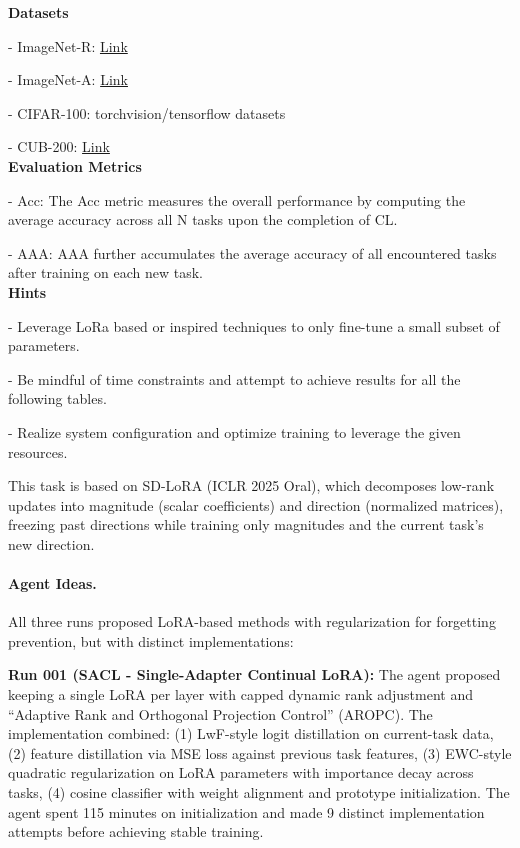\documentclass[11pt]{article}
\theoremstyle{plain}
\theoremstyle{definition}
\theoremstyle{remark}
\begin{document}
\begin{tcolorbox}
\textbf{Datasets}

- ImageNet-R: 
\href{https://drive.google.com/file/d/1SG4TbiL8_DooekztyCVK8mPmfhMo8fkR/view?usp=sharing}{Link}

- ImageNet-A: \href{https://drive.google.com/file/d/19l52ua_vvTtttgVRziCZJjal0TPE9f2p/view?usp=sharing}{Link}

- CIFAR-100: torchvision/tensorflow datasets

- CUB-200: 
\href{https://drive.google.com/file/d/1XbUpnWpJPnItt5zQ6sHJnsjPncnNLvWb/view?usp=sharing}{Link}\\


\textbf{Evaluation Metrics}

- Acc: The Acc metric measures the overall performance by computing the average accuracy across all N tasks upon the completion of CL.

- AAA: AAA further accumulates the average accuracy of all encountered tasks after training on each new task.\\

\textbf{Hints}

- Leverage LoRa based or inspired techniques to only fine-tune a small subset of parameters.

- Be mindful of time constraints and attempt to achieve results for all the following tables.

- Realize system configuration and optimize training to leverage the given resources.

\end{tcolorbox}

This task is based on SD-LoRA (ICLR 2025 Oral), which decomposes low-rank updates into magnitude (scalar coefficients) and direction (normalized matrices), freezing past directions while training only magnitudes and the current task's new direction.

\paragraph{Agent Ideas.} All three runs proposed LoRA-based methods with regularization for forgetting prevention, but with distinct implementations:

\textbf{Run 001 (SACL - Single-Adapter Continual LoRA):} The agent proposed keeping a single LoRA per layer with capped dynamic rank adjustment and ``Adaptive Rank and Orthogonal Projection Control'' (AROPC). The implementation combined: (1) LwF-style logit distillation on current-task data, (2) feature distillation via MSE loss against previous task features, (3) EWC-style quadratic regularization on LoRA parameters with importance decay across tasks, (4) cosine classifier with weight alignment and prototype initialization. The agent spent 115 minutes on initialization and made 9 distinct implementation attempts before achieving stable training.
\end{document}
